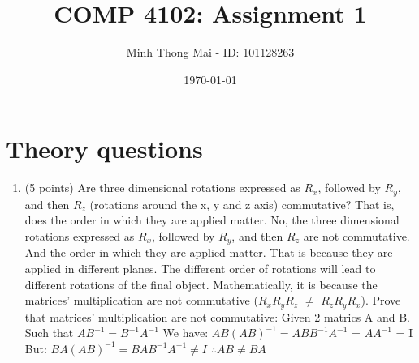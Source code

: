 \documentclass{article} %
\title{COMP 4102: Assignment 1} %
\author{Minh Thong Mai - ID: 101128263} %
\date{\today} %
\begin{document}
    \maketitle %
    
    \section{Theory questions} %
    
    \begin{flushleft}

        \begin{enumerate}
            \item (5 points) Are three dimensional rotations expressed as $\mathit{R}_{x}$, followed by $\mathit{R}_{y}$, and then $\mathit{R}_{z}$ (rotations
            around the x, y and z axis) commutative? That is, does the order in which they are applied matter.
                \bigbreak
                \text No, the three dimensional rotations expressed as $\mathit{R}_{x}$, followed by $\mathit{R}_{y}$, and then $\mathit{R}_{z}$ are not commutative. And the order in which they are applied matter.
                \bigbreak
                \text That is because they are applied in different planes. The different order of rotations will lead to different rotations of the final object. Mathematically, it is because the matrices' multiplication are not commutative ($\mathit{R}_{x}$$\mathit{R}_{y}$$\mathit{R}_{z}$ $\neq$ $\mathit{R}_{z}$$\mathit{R}_{y}$$\mathit{R}_{x}$).
                \bigbreak
                \text Prove that matrices' multiplication are not commutative:
                \break
                \text Given 2 matrics A and B. Such that \(AB^{-1} = B^{-1}A^{-1}\)
                \break
                \text We have: \(AB(AB)^{-1} = ABB^{-1}A^{-1}\)
                                             = \(AA^{-1}\) = I
                \break
                \text But: \(BA(AB)^{-1} = BAB^{-1}A^{-1} \neq I\)
                \break 
                \(\therefore AB \neq BA\)
            

\end{enumerate}
\end{flushleft}
\end{document}
